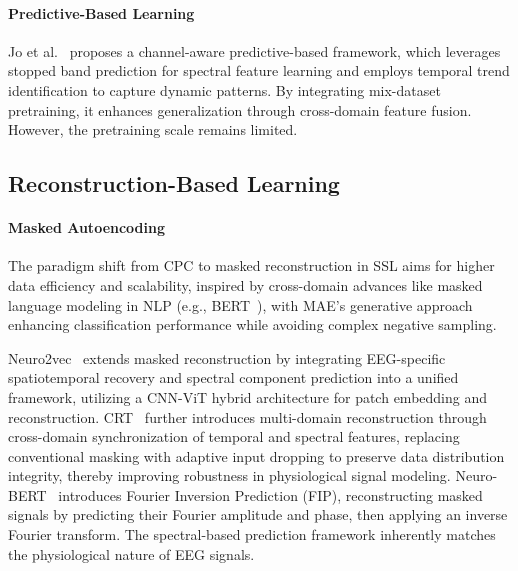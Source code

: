 \paragraph{Predictive-Based Learning}
Jo et al.~\cite{jo2023channel} proposes a channel-aware predictive-based framework, which leverages stopped band prediction for spectral feature learning and employs temporal trend identification to capture dynamic patterns. 
By integrating mix-dataset pretraining, it enhances generalization through cross-domain feature fusion. However, the pretraining scale remains limited.

\subsection{Reconstruction-Based Learning}
\paragraph{Masked Autoencoding}
The paradigm shift from CPC to masked reconstruction in SSL aims for higher data efficiency and scalability, inspired by cross-domain advances like masked language modeling in NLP (e.g., BERT~\cite{devlin2018bert}), with MAE's generative approach enhancing classification performance while avoiding complex negative sampling.

Neuro2vec~\cite{wu2022neuro2vec} extends masked reconstruction by integrating EEG-specific spatiotemporal recovery and spectral component prediction into a unified framework, utilizing a CNN-ViT hybrid architecture for patch embedding and reconstruction. 
CRT~\cite{zhang2023self} further introduces multi-domain reconstruction through cross-domain synchronization of temporal and spectral features, replacing conventional masking with adaptive input dropping to preserve data distribution integrity, thereby improving robustness in physiological signal modeling.
Neuro-BERT~\cite{wu2024neuro} introduces Fourier Inversion Prediction (FIP), reconstructing masked signals by predicting their Fourier amplitude and phase, then applying an inverse Fourier transform. The spectral-based prediction framework inherently matches the physiological nature of EEG signals.

